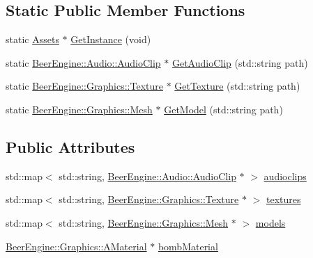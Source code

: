 \subsection*{Static Public Member Functions}
\begin{DoxyCompactItemize}
\item 
static \mbox{\hyperlink{class_assets}{Assets}} $\ast$ \mbox{\hyperlink{class_assets_a1ec0f88affb09ed018d3f8026f64c15b}{Get\+Instance}} (void)
\item 
static \mbox{\hyperlink{class_beer_engine_1_1_audio_1_1_audio_clip}{Beer\+Engine\+::\+Audio\+::\+Audio\+Clip}} $\ast$ \mbox{\hyperlink{class_assets_a8f344169002807c95cb543d1116ea2bb}{Get\+Audio\+Clip}} (std\+::string path)
\item 
static \mbox{\hyperlink{class_beer_engine_1_1_graphics_1_1_texture}{Beer\+Engine\+::\+Graphics\+::\+Texture}} $\ast$ \mbox{\hyperlink{class_assets_a1dc713408638d18566ec35221a0ede24}{Get\+Texture}} (std\+::string path)
\item 
static \mbox{\hyperlink{class_beer_engine_1_1_graphics_1_1_mesh}{Beer\+Engine\+::\+Graphics\+::\+Mesh}} $\ast$ \mbox{\hyperlink{class_assets_a2fcfb2c8c5a0ca4630230f4086b010f6}{Get\+Model}} (std\+::string path)
\end{DoxyCompactItemize}
\subsection*{Public Attributes}
\begin{DoxyCompactItemize}
\item 
std\+::map$<$ std\+::string, \mbox{\hyperlink{class_beer_engine_1_1_audio_1_1_audio_clip}{Beer\+Engine\+::\+Audio\+::\+Audio\+Clip}} $\ast$ $>$ \mbox{\hyperlink{class_assets_a74f01d64e94c8e26e8187d189cd018dc}{audioclips}}
\item 
std\+::map$<$ std\+::string, \mbox{\hyperlink{class_beer_engine_1_1_graphics_1_1_texture}{Beer\+Engine\+::\+Graphics\+::\+Texture}} $\ast$ $>$ \mbox{\hyperlink{class_assets_a973029267b9ab6da8c326f2f7b1404c2}{textures}}
\item 
std\+::map$<$ std\+::string, \mbox{\hyperlink{class_beer_engine_1_1_graphics_1_1_mesh}{Beer\+Engine\+::\+Graphics\+::\+Mesh}} $\ast$ $>$ \mbox{\hyperlink{class_assets_a83d7f0d79376b56cf2c3ca78d4f01df4}{models}}
\item 
\mbox{\hyperlink{class_beer_engine_1_1_graphics_1_1_a_material}{Beer\+Engine\+::\+Graphics\+::\+A\+Material}} $\ast$ \mbox{\hyperlink{class_assets_a3888adb2654159b9791da38233467632}{bomb\+Material}}
\end{DoxyCompactItemize}


